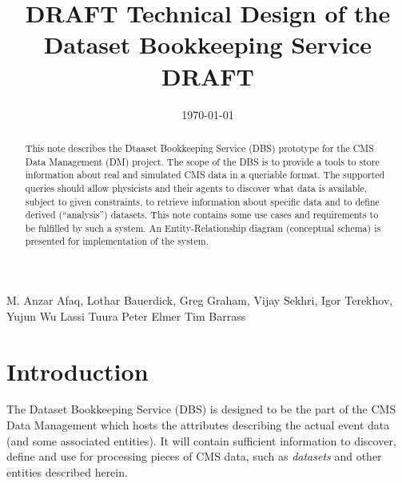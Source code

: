 \documentclass{cmspaper}
\begin{document}

\begin{titlepage}

   \date{\today}

  \title{DRAFT Technical Design of the Dataset Bookkeeping Service DRAFT}


  \begin{Authlist}
    M. Anzar Afaq, Lothar Bauerdick, Greg Graham, Vijay Sekhri, Igor Terekhov, 
    Yujun Wu
    Lassi Tuura
    Peter Elmer
    Tim Barrass
  \end{Authlist}


  \begin{abstract}
      This note describes the Dtaaset Bookkeeping Service (DBS) prototype for the 
  CMS Data Management (DM) project.  The scope of the DBS is to provide a tools to 
  store information about real and simulated CMS data in a queriable format.  The
  supported queries should allow physicists and their agents to discover what 
  data is available, subject to given constraints, to retrieve information 
  about specific data and to define derived (``analysis'') datasets. This note
  contains some use cases and requirements to be fulfilled by such a system.  
  An Entity-Relationship diagram (conceptual schema) is presented for implementation 
  of the system.
  \end{abstract} 

  
\end{titlepage}

\setcounter{page}{2}%

\section{Introduction}

The Dataset Bookkeeping Service (DBS) is designed to be the part of the
CMS Data Management which hosts the attributes describing the actual event data
(and some associated entities). It will contain sufficient information
to discover, define and use for processing pieces of CMS data,
such as {\em datasets} and other entities described herein.
\end{document}
